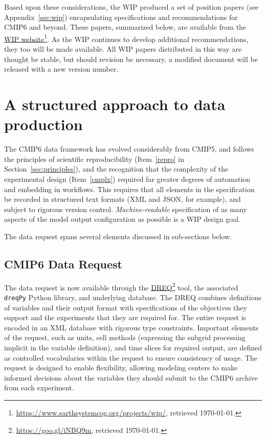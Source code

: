 \documentclass[gmd,manuscript]{copernicus}
\newcommand{\urlref}[2] {\href{#1}{#2}\footnote{\url{#1}, retrieved \today.}}
\begin{document}
Based upon these considerations, the WIP produced a set of position
papers (see Appendix~\ref{sec:wip}) encapsulating specifications and
recommendations for CMIP6 and beyond. These papers, summarized below,
are available from the
\urlref{https://www.earthsystemcog.org/projects/wip/}{WIP website}. As
the WIP continues to develop additional recommendations, they too will
be made available. All WIP papers distributed in this way are thought
be stable, but should revision be necessary, a modified document will
be released with a new version number.

\section{A structured approach to data production}
\label{sec:dreq}

The CMIP6 data framework has evolved considerably from CMIP5, and
follows the principles of scientific reproducibility (Item~\ref{repro}
in Section~\ref{sec:principles}), and the recognition that the complexity of
the experimental design (Item~\ref{cmplx}) required far greater
degrees of automation and embedding in workflows. This requires that 
all elements in the specification be recorded in structured text
formats (XML and JSON, for example), and subject to rigorous version
control. \emph{Machine-readable} specification of as many aspects of
the model output configuration as possible is a WIP design goal.

The data request spans several elements discussed in sub-sections
below.

\subsection{CMIP6 Data Request}
\label{sec:data-request}

The data request \citep{ref:juckesetal2015} is now available
through the \urlref{https://goo.gl/iNBQ9m}{DREQ} tool, the associated
\texttt{dreqPy} Python library, and underlying
database. The DREQ combines definitions of variables and their output
format with specifications of the objectives they support and the
experiments that they are required for. The entire request is encoded
in an XML database with rigorous type constraints. Important elements
of the request, such as units, cell methods (expressing the subgrid
processing implicit in the variable definition), and time slices for
required output, are defined as controlled vocabularies within the
request to ensure consistency of usage. The request is designed to
enable flexibility, allowing modeling centers to make informed
decisions about the variables they should submit to the CMIP6 archive
from each experiment.
\end{document}
